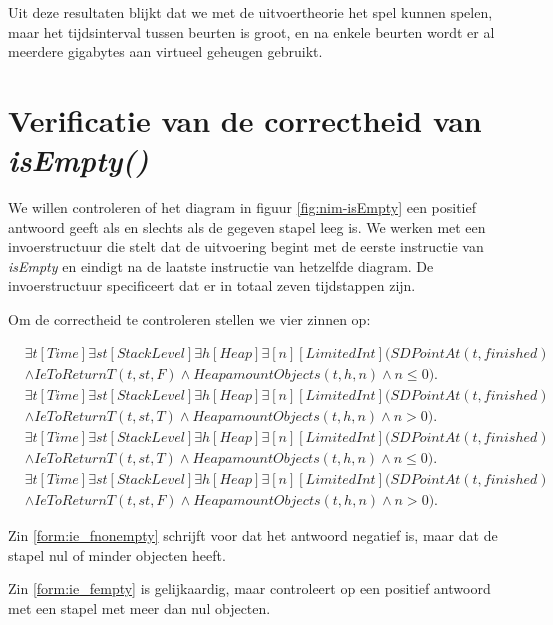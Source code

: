 Uit deze resultaten blijkt dat we met de uitvoertheorie het spel kunnen spelen, maar het tijdsinterval tussen beurten is groot, en na enkele beurten wordt er al meerdere gigabytes aan virtueel geheugen gebruikt.

\section{Verificatie van de correctheid van \textit{isEmpty()}}

We willen controleren of het diagram in figuur \ref{fig:nim-isEmpty} een positief antwoord geeft als en slechts als de gegeven stapel leeg is. We werken met een invoerstructuur die stelt dat de uitvoering begint met de eerste instructie van \textit{isEmpty} en eindigt na de laatste instructie van hetzelfde diagram. De invoerstructuur specificeert dat er in totaal zeven tijdstappen zijn.

Om de correctheid te controleren stellen we vier zinnen op:

\begin{align}
	\nonumber&\exists{t}[Time]\exists{st}[StackLevel]\exists{h}[Heap]\exists[n][LimitedInt](SDPointAt(t, finished) \\ &\land IeToReturnT(t, st, F) \land HeapamountObjects(t, h, n) \land n \leq 0).\label{form:ie_fnonempty} \\
	\nonumber&\exists{t}[Time]\exists{st}[StackLevel]\exists{h}[Heap]\exists[n][LimitedInt](SDPointAt(t, finished) \\ &\land IeToReturnT(t, st, T) \land HeapamountObjects(t, h, n) \land n > 0).\label{form:ie_fempty} \\
	\nonumber&\exists{t}[Time]\exists{st}[StackLevel]\exists{h}[Heap]\exists[n][LimitedInt](SDPointAt(t, finished) \\ &\land IeToReturnT(t, st, T) \land HeapamountObjects(t, h, n) \land n \leq 0).\label{form:ie_cempty} \\
	\nonumber&\exists{t}[Time]\exists{st}[StackLevel]\exists{h}[Heap]\exists[n][LimitedInt](SDPointAt(t, finished) \\ &\land IeToReturnT(t, st, F) \land HeapamountObjects(t, h, n) \land n > 0).\label{form:ie_cnonempty}
\end{align}

Zin \ref{form:ie_fnonempty} schrijft voor dat het antwoord negatief is, maar dat de stapel nul of minder objecten heeft.

Zin \ref{form:ie_fempty} is gelijkaardig, maar controleert op een positief antwoord met een stapel met meer dan nul objecten.

